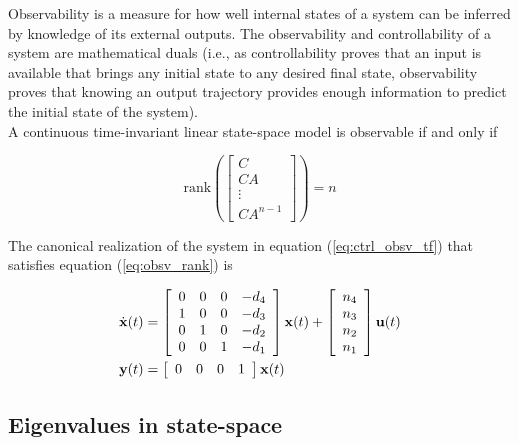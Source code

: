 Observability is a measure for how well internal \glspl{state} of a \gls{system}
can be inferred by knowledge of its external outputs. The observability and
controllability of a \gls{system} are mathematical duals (i.e., as
controllability proves that an input is available that brings any initial
\gls{state} to any desired final \gls{state}, observability proves that knowing
an output trajectory provides enough information to predict the initial
\gls{state} of the \gls{system}). \\

A continuous \gls{time-invariant} linear state-space \gls{model} is observable
if and only if

\begin{equation} \label{eq:obsv_rank}
  \text{rank} \left(\left[
  \begin{array}{c}
    C \\
    CA \\
    \vdots \\
    CA^{n-1}
  \end{array}
  \right]\right) = n
\end{equation}

The canonical \gls{realization} of the \gls{system} in equation
(\ref{eq:ctrl_obsv_tf}) that satisfies equation (\ref{eq:obsv_rank}) is

\begin{align}
  \dot{\mathbf{x}}(t) &= \left[
  \begin{array}{cccc}
    0 & 0 & 0 & -d_4 \\
    1 & 0 & 0 & -d_3 \\
    0 & 1 & 0 & -d_2 \\
    0 & 0 & 1 & -d_1
  \end{array}
  \right] \mathbf{x}(t) + \left[
  \begin{array}{c}
    n_4 \\
    n_3 \\
    n_2 \\
    n_1
  \end{array}
  \right] \mathbf{u}(t) \\
  \mathbf{y}(t) &= \left[
  \begin{array}{cccc}
    0 & 0 & 0 & 1
  \end{array}
  \right] \mathbf{x}(t)
\end{align}

\subsection{Eigenvalues in state-space}

